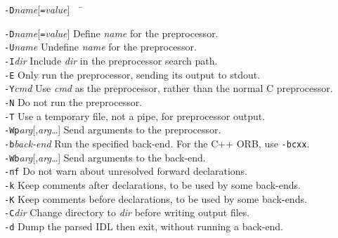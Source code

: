 \documentclass[11pt,twoside,a4paper]{book}
\newcommand{\cmdline}[1]{\texttt{#1}}
\begin{document}
\begin{tabbing}
\cmdline{-D}\textit{name}[\cmdline{=}\textit{value}]~~ \= \kill

\cmdline{-D}\textit{name}[\cmdline{=}\textit{value}]
     \> Define \textit{name} for the preprocessor.\\

\cmdline{-U}\textit{name}
     \> Undefine \textit{name} for the preprocessor.\\

\cmdline{-I}\textit{dir}
     \> Include \textit{dir} in the preprocessor search path.\\

\cmdline{-E}
     \> Only run the preprocessor, sending its output to stdout.\\

\cmdline{-Y}\textit{cmd}
     \> Use \textit{cmd} as the preprocessor, rather than the normal C
        preprocessor.\\

\cmdline{-N}
     \> Do not run the preprocessor.\\

\cmdline{-T}
     \> Use a temporary file, not a pipe, for preprocessor output.\\

\cmdline{-Wp}\textit{arg}[,\textit{arg}\dots]
     \> Send arguments to the preprocessor.\\

\cmdline{-b}\textit{back-end}
     \> Run the specified back-end. For the C++ ORB, use \cmdline{-bcxx}.\\

\cmdline{-Wb}\textit{arg}[,\textit{arg}\dots]
     \> Send arguments to the back-end.\\

\cmdline{-nf}
     \> Do not warn about unresolved forward declarations.\\

\cmdline{-k}
     \> Keep comments after declarations, to be used by some back-ends.\\

\cmdline{-K}
     \> Keep comments before declarations, to be used by some back-ends.\\

\cmdline{-C}\textit{dir}
     \> Change directory to \textit{dir} before writing output files.\\

\cmdline{-d}
     \> Dump the parsed IDL then exit, without running a back-end.\\


\end{tabbing}
\end{document}
